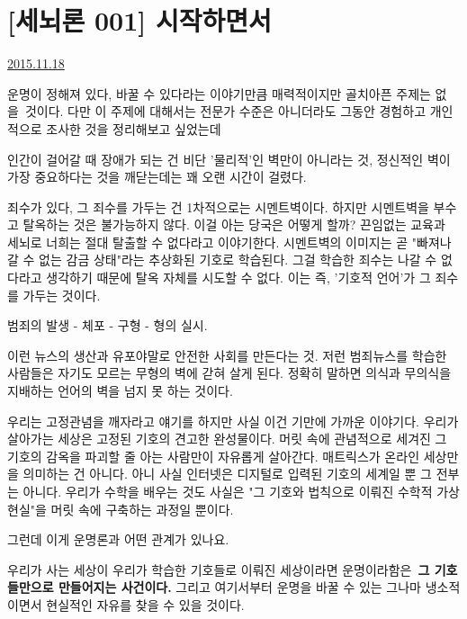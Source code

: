 


\section{[세뇌론 001] 시작하면서}
\href{https://www.kockoc.com/Apoc/499247}{2015.11.18}

\vspace{5mm}

운명이 정해져 있다, 바꿀 수 있다라는 이야기만큼 매력적이지만 골치아픈 주제는 없을 것이다.
다만 이 주제에 대해서는 전문가 수준은 아니더라도 그동안 경험하고 개인적으로 조사한 것을 정리해보고 싶었는데
\vspace{5mm}

인간이 걸어갈 때 장애가 되는 건 비단 '물리적'인 벽만이 아니라는 것,
정신적인 벽이 가장 중요하다는 것을 깨닫는데는 꽤 오랜 시간이 걸렸다.
\vspace{5mm}

죄수가 있다, 그 죄수를 가두는 건 1차적으로는 시멘트벽이다.
하지만 시멘트벽을 부수고 탈옥하는 것은 불가능하지 않다. 이걸 아는 당국은 어떻게 할까?
끈임없는 교육과 세뇌로 너희는 절대 탈출할 수 없다라고 이야기한다.
시멘트벽의 이미지는 곧 "빠져나갈 수 없는 감금 상태"라는 추상화된 기호로 학습된다.
그걸 학습한 죄수는 나갈 수 없다라고 생각하기 때문에 탈옥 자체를 시도할 수 없다.
이는 즉, '기호적 언어'가 그 죄수를 가두는 것이다.
\vspace{5mm}

범죄의 발생 - 체포 - 구형 - 형의 실시.
\vspace{5mm}

이런 뉴스의 생산과 유포야말로 안전한 사회를 만든다는 것.
저런 범죄뉴스를 학습한 사람들은 자기도 모르는 무형의 벽에 갇혀 살게 된다.
정확히 말하면 의식과 무의식을 지배하는 언어의 벽을 넘지 못 하는 것이다.
\vspace{5mm}

우리는 고정관념을 깨자라고 얘기를 하지만 사실 이건 기만에 가까운 이야기다.
우리가 살아가는 세상은 고정된 기호의 견고한 완성물이다.
머릿 속에 관념적으로 세겨진 그 기호의 감옥을 파괴할 줄 아는 사람만이 자유롭게 살아간다.
매트릭스가 온라인 세상만을 의미하는 건 아니다. 아니 사실 인터넷은 디지털로 입력된 기호의 세계일 뿐 그 전부는 아니다.
우리가 수학을 배우는 것도 사실은 "그 기호와 법칙으로 이뤄진 수학적 가상현실"을 머릿 속에 구축하는 과정일 뿐이다.
\vspace{5mm}

그런데 이게 운명론과 어떤 관계가 있나요.
\vspace{5mm}

우리가 사는 세상이 우리가 학습한 기호들로 이뤄진 세상이라면
운명이라함은 \textbf{그 기호들만으로 만들어지는 사건이다.}
그리고 여기서부터 운명을 바꿀 수 있는 그나마 냉소적이면서 현실적인 자유를 찾을 수 있을 것이다.
\vspace{5mm}






